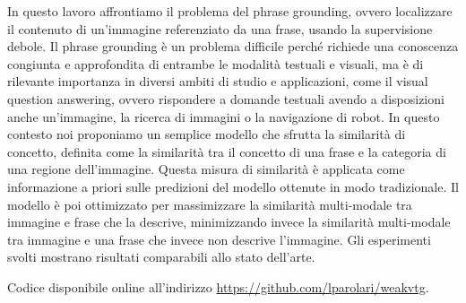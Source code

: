 
In questo lavoro affrontiamo il problema del phrase grounding, ovvero
localizzare il contenuto di un'immagine referenziato da una frase,
usando la supervisione debole. Il phrase grounding è un problema
difficile perché richiede una conoscenza congiunta e approfondita di
entrambe le modalità testuali e visuali, ma è di rilevante importanza
in diversi ambiti di studio e applicazioni, come il visual question
answering, ovvero rispondere a domande testuali avendo a disposizioni
anche un'immagine, la ricerca di immagini o la navigazione di robot.
In questo contesto noi proponiamo un semplice modello che sfrutta la
similarità di concetto, definita come la similarità tra il concetto di
una frase e la categoria di una regione dell'immagine. Questa misura
di similarità è applicata come informazione a priori sulle predizioni
del modello ottenute in modo tradizionale. Il modello è poi
ottimizzato per massimizzare la similarità multi-modale tra immagine e
frase che la descrive, minimizzando invece la similarità multi-modale
tra immagine e una frase che invece non descrive l'immagine. Gli
esperimenti svolti mostrano risultati comparabili allo stato
dell'arte.

Codice disponibile online all'indirizzo
\href{https://github.com/lparolari/weakvtg}{https://github.com/lparolari/weakvtg}.
